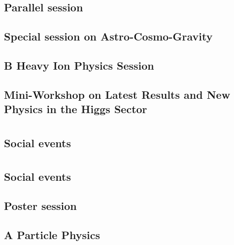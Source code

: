 \subsection{Parallel session}

\clearpage

\subsection{Special session on Astro-Cosmo-Gravity}

\clearpage

\subsection{B Heavy Ion Physics Session}

\clearpage

\subsection{Mini-Workshop on Latest Results and New Physics in the Higgs Sector}

\clearpage

\section{}
\subsection{Social events}

\clearpage

\section{}
\subsection{Social events}

\clearpage

\subsection{Poster session}

\clearpage

\subsection{A Particle Physics}

\clearpage

